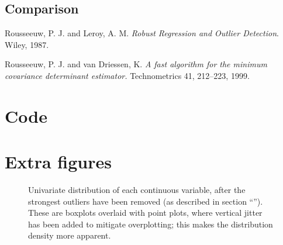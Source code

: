 \documentclass[a4paper, 12pt]{article}
\newcommand{\widefig}[1]{\makebox[\textwidth][c]{\texttt{[image: \#1]}}%
}
\newcommand{\sectionref}[1]{section ``\nameref{#1}''}
\begin{document}
\subsection*{Comparison}


\begin{thebibliography}{9}
Rousseeuw, P. J. and Leroy, A. M. 
\textit{Robust Regression and Outlier Detection}. 
Wiley, 1987.

Rousseeuw, P. J. and van Driessen, K.
\textit{A fast algorithm for the minimum covariance determinant estimator.}
Technometrics 41, 212–223, 1999.
\end{thebibliography}


\clearpage
\appendix

\section{Code}
\FloatBarrier
{}







\clearpage
\FloatBarrier
\section{Extra figures}

\begin{figure}
  \widefig{img/jitterbox_engine_capacity}
  \widefig{img/jitterbox_urban_metric}
  \widefig{img/jitterbox_extra_urban_metric}
  \widefig{img/jitterbox_combined_metric}
  \widefig{img/jitterbox_noise_level}
  \widefig{img/jitterbox_co2}
  \widefig{img/jitterbox_co_emissions}
  \widefig{img/jitterbox_nox_emissions}
  \caption{Univariate distribution of each continuous variable, after the strongest outliers have been removed (as described in \sectionref{outlier_removal}). These are boxplots overlaid with point plots, where vertical jitter has been added to mitigate overplotting; this makes the distribution density more apparent.}
  \label{jitterboxes}
\end{figure}
\end{document}
